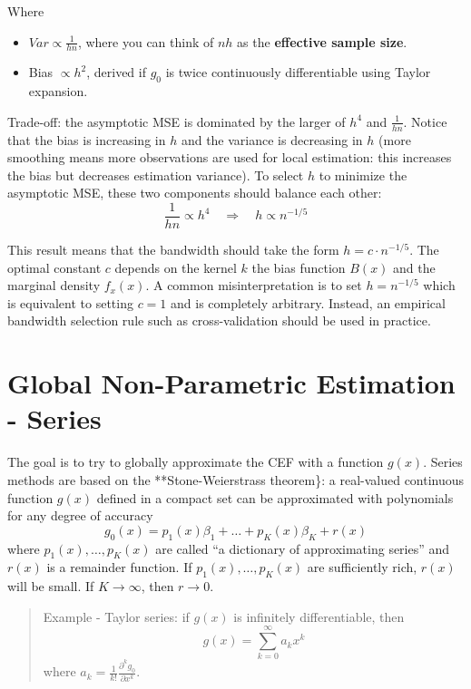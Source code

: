 \documentclass[12pt,]{book}
\providecommand{\tightlist}{%
  \setlength{\itemsep}{0pt}\setlength{\parskip}{0pt}}
\begin{document}
Where

\begin{itemize}
\tightlist
\item
  \(Var \propto \frac{1}{h n}\), where you can think of \(n h\) as the \textbf{effective sample size}.
\item
  Bias \(\propto h^2\), derived if \(g_0\) is twice continuously differentiable using Taylor expansion.
\end{itemize}

Trade-off: the asymptotic MSE is dominated by the larger of \(h^4\) and \(\frac{1}{h n}\). Notice that the bias is increasing in \(h\) and the variance is decreasing in \(h\) (more smoothing means more observations are used for local estimation: this increases the bias but decreases estimation variance). To select \(h\) to minimize the asymptotic MSE, these two components should balance each other:
\[
\frac{1}{h n} \propto h^4 \quad \Rightarrow \quad  h \propto n^{-1/5} 
\]

This result means that the bandwidth should take the form \(h = c \cdot n^{-1/5}\). The optimal constant \(c\) depends on the kernel \(k\) the bias function \(B(x)\) and the marginal density \(f_x(x)\). A common misinterpretation is to set \(h = n^{-1/5}\) which is equivalent to setting \(c = 1\) and is completely arbitrary. Instead, an empirical bandwidth selection rule such as cross-validation should be used in practice.

\hypertarget{global-non-parametric-estimation---series}{%
\section{Global Non-Parametric Estimation - Series}\label{global-non-parametric-estimation---series}}

The goal is to try to globally approximate the CEF with a function \(g(x)\). Series methods are based on the **Stone-Weierstrass theorem\}: a real-valued continuous function \(g(x)\) defined in a compact set can be approximated with polynomials for any degree of accuracy
\[
    g_0 (x) = p_1 (x) \beta _1 + \dots + p_K (x) \beta_K + r(x)
\]
where \(p_1(x), \dots, p_K(x)\) are called ``a dictionary of approximating series'' and \(r(x)\) is a remainder function. If \(p_1(x), \dots, p_K(x)\) are sufficiently rich, \(r(x)\) will be small. If \(K \to \infty\), then \(r \to 0\).

\begin{quote}
Example - Taylor series: if \(g(x)\) is infinitely differentiable, then
\[
g(x) = \sum_{k=0}^{\infty } a_k x^k
\]
where \(a_k = \frac{1}{k!} \frac{\partial^k g_0}{\partial x^k}\).
\end{quote}
\end{document}
